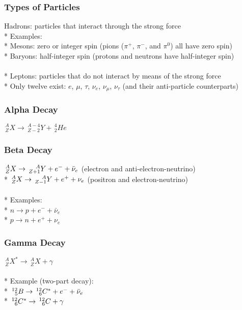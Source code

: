 \subsubsection{Types of Particles}
Hadrons: particles that interact through the strong force\\*
Examples:\\*
Mesons: zero or integer spin (pions (\(\pi^+\), \(\pi^-\), and \(\pi^0\)) all have zero spin)\\*
Baryons: half-integer spin (protons and neutrons have half-integer spin)\\\\*
Leptons: particles that do not interact by means of the strong force\\*
Only twelve exist: \(e\), \(\mu\), \(\tau\), \(\nu_e\), \(\nu_{\mu}\), \(\nu_{\tau}\) (and their anti-particle counterparts)

\subsubsection{Alpha Decay}
\(\,^A_ZX\rightarrow \,^{A-4}_{Z-2}Y+\,^4_2He\)

\subsubsection{Beta Decay}
\(\,^A_ZX\rightarrow \,^{\hspace{.35cm}A}_{Z+1}Y+e^-+\bar{\nu}_e\) (electron and anti-electron-neutrino)\\*
\(\,^A_ZX\rightarrow \,^{\hspace{.35cm}A}_{Z-1}Y+e^++\nu_e\) (positron and electron-neutrino)\\\\*
%
Examples:\\*
\(n\rightarrow p+e^-+\bar{\nu}_e\)\\*
\(p\rightarrow n+e^++\nu_e\)

\subsubsection{Gamma Decay}
\(\,^A_ZX^*\rightarrow \,^A_ZX+\gamma\)\\\\*
%
Example (two-part decay):\\*
\(\,^{12}_{\hspace{.15cm}5}B\rightarrow \,^{12}_{\hspace{.15cm}6}C^*+e^-+\bar{\nu}_e\)\\*
\(\,^{12}_{\hspace{.15cm}6}C^*\rightarrow \,^{12}_{\hspace{.15cm}6}C+\gamma\)

